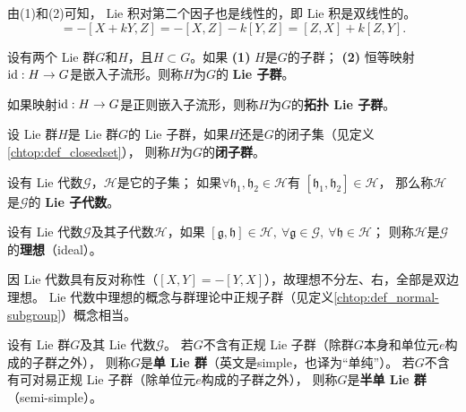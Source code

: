 由(1)和(2)可知， Lie 积对第二个因子也是线性的，即 Lie 积是双线性的。
\begin{equation*}
    [Z,  X + k Y]= -[ X + k Y, Z]= -[X, Z]- k[Y, Z] = [Z,X]+ k[Z, Y].
\end{equation*}



\begin{definition}
    设有两个 Lie 群$G$和$H$，且$H\subset G$。如果 {\bfseries (1)} $H$是$G$的子群；
    {\bfseries (2)} 恒等映射${\rm id}:H\to G$是嵌入子流形。则称$H$为$G$的\textbf{ Lie 子群}。
    
    如果映射${\rm id}:H\to G$是正则嵌入子流形，则称$H$为$G$的\textbf{拓扑 Lie 子群}。
\end{definition}

\begin{definition}
    设 Lie 群$H$是 Lie 群$G$的 Lie 子群，如果$H$还是$G$的闭子集（见定义\ref{chtop:def_closedset}），
    则称$H$为$G$的\textbf{闭子群}。
\end{definition}

\begin{definition}
    设有 Lie 代数$\mathscr{G}$，$\mathscr{H}$是它的子集；
    如果$\forall \mathfrak{h}_1,\mathfrak{h}_2\in \mathscr{H}$有
    $[\mathfrak{h}_1,\mathfrak{h}_2]\in \mathscr{H}$，
    那么称$\mathscr{H}$是$\mathscr{G}$的\textbf{ Lie 子代数}。
\end{definition}

\begin{definition}
    设有 Lie 代数$\mathscr{G}$及其子代数$\mathscr{H}$，如果
    $   [\mathfrak{g},\mathfrak{h}]\in  \mathscr{H},\ 
    \forall \mathfrak{g}\in \mathscr{G}, \ \forall\mathfrak{h}\in\mathscr{H}$；
    则称$\mathscr{H}$是$\mathscr{G}$的\textbf{理想}（ideal）。
\end{definition}
因 Lie 代数具有反对称性（$[X,Y]=-[Y,X]$），故理想不分左、右，全部是双边理想。
 Lie 代数中理想的概念与群理论中正规子群（见定义\ref{chtop:def_normal-subgroup}）概念相当。




\begin{definition}
    设有 Lie 群$G$及其 Lie 代数$\mathscr{G}$。
    若$G$不含有正规 Lie 子群（除群$G$本身和单位元$e$构成的子群之外），
    则称$G$是\textbf{单 Lie 群}（英文是simple，也译为“单纯”）。
    若$G$不含有{\kaishu 可对易}正规 Lie 子群（除单位元$e$构成的子群之外），
    则称$G$是\textbf{半单 Lie 群}（semi-simple）。
\end{definition}

